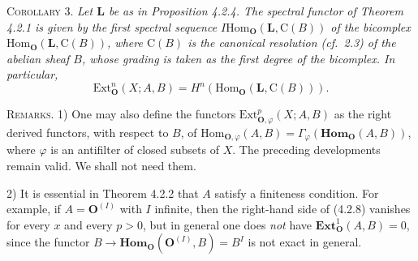 \textsc{Corollary 3.} \textit{Let $\mathbf{L}$ be as in Proposition
\textup{4.2.4}. The spectral functor of Theorem \textup{4.2.1} is given by the first spectral
sequence $I\mathrm{Hom}_{\mathbf O}(\mathbf{L},{\mathrm C}(B))$ of the bicomplex
$\mathrm{Hom}_{\mathbf O}(\mathbf{L},{\mathrm C}(B))$, where ${\mathrm C}(B)$ is the canonical resolution
\textup{(}cf.\ \textup{2.3)} of the abelian sheaf $B$, whose grading is taken as the first degree
of the bicomplex. In particular,}
\[
\mathrm{Ext}_{\mathbf O}^n(X;A,B)=
H^n(\mathrm{Hom}_{\mathbf O}(\mathbf{L},{\mathrm C}(B))).
\]

\textsc{Remarks.} 1) One may also define the functors
$\mathrm{Ext}_{{\mathbf O},\varphi}^p(X;A,B)$ as the right derived functors, with
respect to $B$, of
$\mathrm{Hom}_{{\mathbf O},\varphi}(A,B)=
\Gamma_\varphi(\mathbf{Hom}_{\mathbf O}(A,B))$, where $\varphi$ is an antifilter of
closed subsets of $X$. The preceding developments remain valid. We shall not
need them.

2) It is essential in Theorem 4.2.2 that $A$ satisfy a finiteness condition.
For example, if $A={\mathbf O}^{(I)}$ with $I$ infinite, then the right-hand side of
(4.2.8) vanishes for every $x$ and every $p>0$, but in general one does
\textit{not} have $\mathbf{Ext}_{\mathbf O}^1(A,B)=0$, since the functor
$B\to\mathbf{Hom}_{\mathbf O}({\mathbf O}^{(I)},B)=B^I$ is not exact in general.


